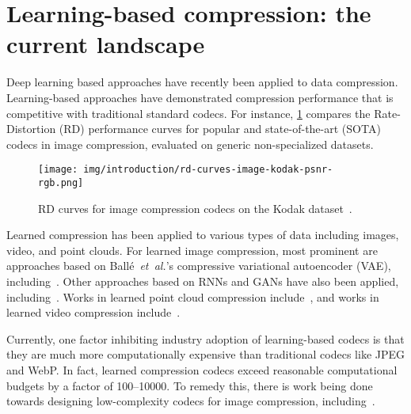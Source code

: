 \section{Learning-based compression: the current landscape}

Deep learning based approaches have recently been applied to data compression.
Learning-based approaches have demonstrated compression performance that is competitive with traditional standard codecs.
For instance, \cref{fig:intro/rd-curves} compares the Rate-Distortion (RD) performance curves for popular and state-of-the-art (SOTA) codecs in image compression, evaluated on generic non-specialized datasets.

\begin{figure}[htbp]
  \centering
  \texttt{[image: img/introduction/rd-curves-image-kodak-psnr-rgb.png]}
  \caption[RD curves of all codecs on the Kodak dataset]{%
    RD curves for image compression codecs on the Kodak dataset~\cite{kodak_dataset}.%
  }
  \label{fig:intro/rd-curves}
\end{figure}


Learned compression has been applied to various types of data including images, video, and point clouds.
For learned image compression, most prominent are approaches based on Ballé~\emph{et~al.}'s compressive variational autoencoder (VAE), including~\cite{minnen2018joint,cheng2020learned,he2022elic}.
Other approaches based on RNNs and GANs have also been applied, including~\cite{toderici2017rnn,mentzer2020highfidelity}.
Works in learned point cloud compression include~\cite{yan2019deep,he2022density,pang2022graspnet,fu2022octattention,you2022ipdae}, and works in learned video compression include~\cite{rippel2019learned,agustsson2020scalespaceflow,hu2021fvc,ho2022canf}.

Currently, one factor inhibiting industry adoption of learning-based codecs is that they are much more computationally expensive than traditional codecs like JPEG and WebP.
In fact, learned compression codecs exceed reasonable computational budgets by a factor of 100--10000\texttimes{}.
To remedy this, there is work being done towards designing low-complexity codecs for image compression, including~\cite{galpin2023entropy,ladune2023coolchic,leguay2023lowcomplexity,kamisli2023lowcomplexity}.

